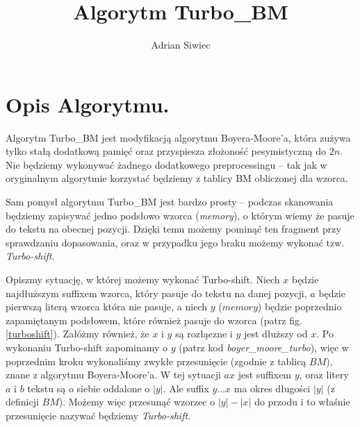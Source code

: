 \documentclass[12pt]{article}
\newcommand{\TBM}{Turbo\_BM }
\theoremstyle{plain}
\begin{document}
\title{Algorytm \TBM}
\author{Adrian Siwiec}
\maketitle

\section*{Opis Algorytmu.}
Algorytm \TBM jest modyfikacją algorytmu Boyera-Moore'a, która zużywa tylko stałą dodatkową pamięć oraz przyspiesza złożoność pesymistyczną do $2n$. Nie będziemy wykonywać żadnego dodatkowego preprocessingu -- tak jak w oryginalnym algorytmie korzystać będziemy z tablicy BM obliczonej dla wzorca.
  
Sam pomysł algorytmu \TBM jest bardzo prosty -- podczas skanowania będziemy zapisywać jedno podsłowo wzorca (\emph{memory}), o którym wiemy że pasuje do tekstu na obecnej pozycji. Dzięki temu możemy pominąć ten fragment przy sprawdzaniu dopasowania, oraz w przypadku jego braku możemy wykonać tzw. \emph{Turbo-shift}.

Opiszmy sytuację, w której możemy wykonać Turbo-shift. Niech $x$ będzie najdłuższym suffixem wzorca, który pasuje do tekstu na danej pozycji, $a$ będzie pierwszą literą wzorca która nie pasuje, a niech $y$ ($memory$) będzie poprzednio zapamiętanym podsłowem, które również pasuje do wzorca (patrz fig. \ref{turboshift}). Załóżmy również, że $x$ i $y$ są rozłączne i $y$ jest dłuższy od $x$. Po wykonaniu Turbo-shift zapominamy o $y$ (patrz kod \emph{boyer\_moore\_turbo}), więc w poprzednim kroku wykonaliśmy zwykłe przesunięcie (zgodnie z tablicą $BM$), znane z algorytmu Boyera-Moore'a. W tej sytuacji $ax$ jest suffixem $y$, oraz litery $a$ i $b$ tekstu są o siebie oddalone o $|y|$. Ale suffix $y\ldots x$ ma okres długości $|y|$ (z definicji $BM$). Możemy więc przesunąć wzorzec o $|y| - |x|$ do przodu i to właśnie przesunięcie nazywać będziemy \emph{Turbo-shift}.

\end{document}
